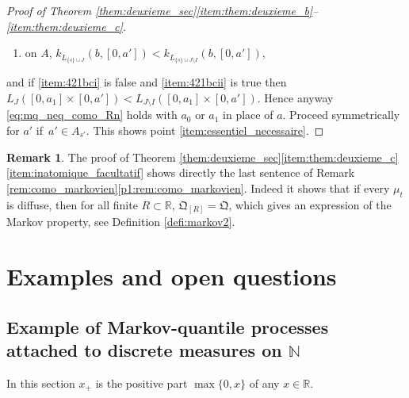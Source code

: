 \documentclass[11pt]{article}
\newcommand{\Subsection}{\subsection}
\renewcommand{\theenumi}{\alph{enumi}}
\renewcommand{\theenumii}{\roman{enumii}}
\newenvironment{enumeratei}
{\bgroup\def\theenumi{\roman{enumi}}\def\theenumii{\arabic{enumii}}\begin{enumerate}}
{\end{enumerate}\egroup}
\theoremstyle{plain}
\theoremstyle{definition}
\newtheorem{rem}[them]{Remark}
\newcommand{\como}{\mathfrak{Q}}
\newcommand{\R}{\mathbb{R}}
\newcommand{\N}{\mathbb{N}}
\begin{document}
\begin{proof}[Proof of Theorem \ref{them:deuxieme_sec}\eqref{item:them:deuxieme_b}--\eqref{item:them:deuxieme_c}]
\begin{enumeratei}
\item\label{item:421bcii}
on $A$, $k_{L_{\{s\}\cup J}}(b,[0,a'])< k_{L_{\{s\}\cup J\setminus I}}(b,[0,a'])$,
\end{enumeratei}
\noindent
and if \eqref{item:421bci} is false and \eqref{item:421bcii} is true then $L_{ J}([0,a_1]\times[0,a'])< L_{ J\setminus I}([0,a_1]\times[0,a'])$. Hence anyway \eqref{eq:mq_neq_como_Rn} holds with $a_0$ or $a_1$ in place of $a$. Proceed symmetrically for $a'$ if~$a'\in A_{s'}$. This shows point \eqref{item:essentiel_necessaire}.
\end{proof}

\begin{rem}\label{rem:demo_nonatomique} The proof of Theorem \ref{them:deuxieme_sec}\eqref{item:them:deuxieme_c}\eqref{item:inatomique_facultatif} shows directly the last sentence of Remark \ref{rem:como_markovien}\eqref{p1:rem:como_markovien}. Indeed it shows that if every $\mu_t$ is diffuse, then for all finite $R\subset\R$, $\como_{[R]}=\como$, which gives an expression of the Markov property, see Definition \ref{defi:markov2}.
\end{rem}

\section{Examples and open questions}\label{sec:exemples}
\Subsection{Example of Markov-quantile processes attached to discrete measures on $\N$}

In this section $x_+$ is the positive part $\max\{0,x\}$ of any $x\in\R$.
\end{document}
